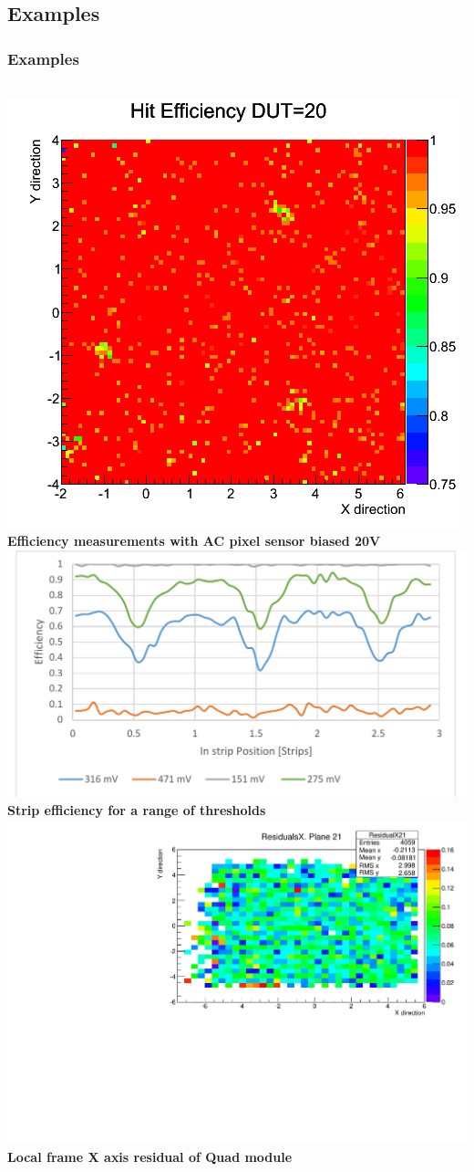 \documentclass{beamer}
\begin{document}
\subsection{Examples}
\begin{frame}
\frametitle{Examples}
\begin{columns}[t]
\centering
\includegraphics[width=0.65\linewidth]{pics/desy250x50AC_250x50DC_20V20.png}\\
\tiny{\textbf{Efficiency measurements with AC pixel sensor biased 20V }}\\ 
\includegraphics[width=0.8\linewidth]{pics/may2015Testbeam_cropped.pdf}\\
\tiny{\textbf{Strip efficiency for a range of thresholds}}\\
\centering
\includegraphics[width=1\linewidth]{pics/QuadXRes73Micron.pdf}\\ 
\tiny{\textbf{Local frame X axis residual of Quad module}}


\end{columns}
\end{frame}
\end{document}
